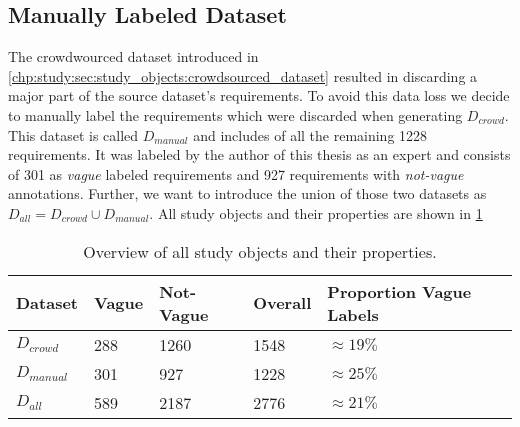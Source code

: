 \subsection{Manually Labeled Dataset}
\label{chp:study:sec:study_objects:dataset_creation:manual_labeling}
The crowdwourced dataset introduced in \cref{chp:study:sec:study_objects:crowdsourced_dataset} resulted in discarding a major part of the source dataset's requirements.
To avoid this data loss we decide to manually label the requirements which were discarded when generating $D_{crowd}$.
This dataset is called $D_{manual}$ and includes of all the remaining 1228 requirements.
It was labeled by the author of this thesis as an expert and consists of 301 as \textit{vague} labeled requirements and 927 requirements with \textit{not-vague} annotations.
Further, we want to introduce the union of those two datasets as $D_{all} = D_{crowd} \cup D_{manual}$.
All study objects and their properties are shown in \cref{tab:study:objects:all_datasets}

\begin{table}[htpb]
    \centering
    \begin{tabular}{l l l l l}
        \toprule
        Dataset & Vague & Not-Vague & Overall & Proportion Vague Labels \\
        \midrule
        $D_{crowd}$ & 288 & 1260 & 1548 & $\approx19\%$\\
        $D_{manual}$ & 301 & 927 & 1228 & $\approx25\%$\\
        \midrule
        $D_{all}$ & 589 & 2187 & 2776 &  $\approx21\%$\\
        \bottomrule
    \end{tabular}
    \caption[Overview of all study objects]{Overview of all study objects and their properties.}\label{tab:study:objects:all_datasets}
\end{table}
